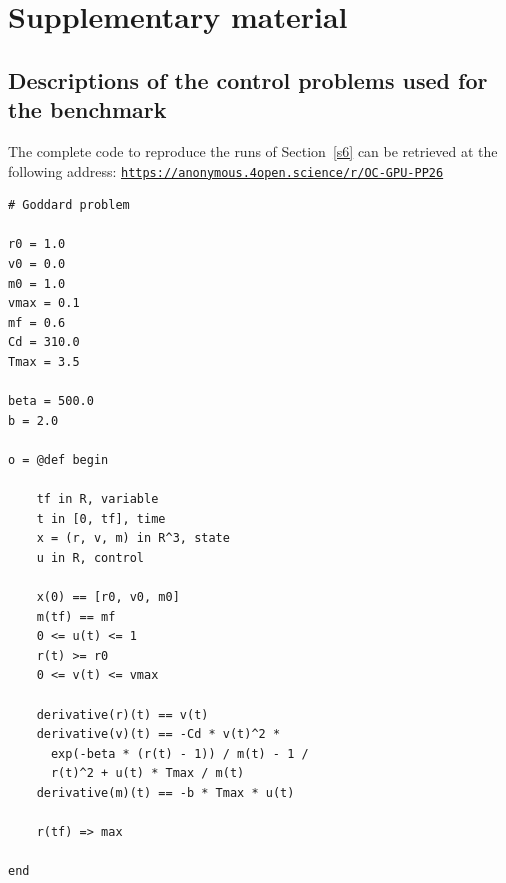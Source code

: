 % 



\newpage
\appendix 

\section{Supplementary material}

\subsection{Descriptions of the control problems used for the benchmark}
\label{sa1}
The complete code to reproduce the runs of Section~\ref{s6} can be retrieved at the following address:
\href{https://anonymous.4open.science/r/OC-GPU-PP26}{\texttt{https://anonymous.4open.science/r/OC-GPU-PP26}}

{\small
\begin{verbatim}
# Goddard problem

r0 = 1.0     
v0 = 0.0
m0 = 1.0 
vmax = 0.1 
mf = 0.6   
Cd = 310.0
Tmax = 3.5

beta = 500.0
b = 2.0

o = @def begin

    tf in R, variable
    t in [0, tf], time
    x = (r, v, m) in R^3, state
    u in R, control

    x(0) == [r0, v0, m0]
    m(tf) == mf
    0 <= u(t) <= 1
    r(t) >= r0
    0 <= v(t) <= vmax

    derivative(r)(t) == v(t)
    derivative(v)(t) == -Cd * v(t)^2 *
      exp(-beta * (r(t) - 1)) / m(t) - 1 /
      r(t)^2 + u(t) * Tmax / m(t)
    derivative(m)(t) == -b * Tmax * u(t)

    r(tf) => max

end
\end{verbatim}
}

